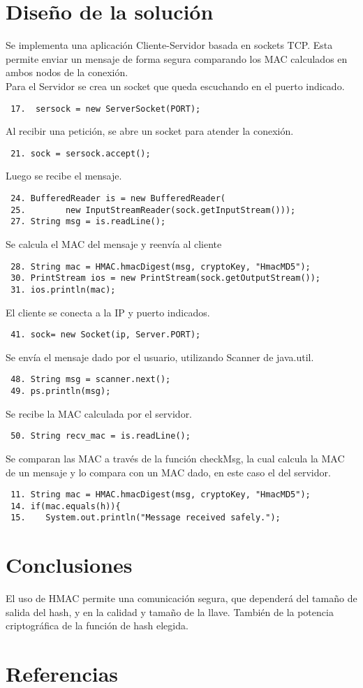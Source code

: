 \documentclass[letter, 10pt]{article}
\begin{document}
\section{Diseño de la solución}
Se implementa una aplicación Cliente-Servidor basada en sockets TCP. Esta permite enviar un mensaje de forma
segura comparando los MAC calculados en ambos nodos de la conexión.
\newline
\\
Para el Servidor se crea un socket que queda escuchando en el puerto indicado.
\begin{verbatim}
 17.  sersock = new ServerSocket(PORT);
\end{verbatim}
Al recibir una petición, se abre un socket para atender la conexión.  
\begin{verbatim}
 21. sock = sersock.accept();
\end{verbatim}
Luego se recibe el mensaje.
\begin{verbatim}
 24. BufferedReader is = new BufferedReader(
 25.        new InputStreamReader(sock.getInputStream()));
 27. String msg = is.readLine();
\end{verbatim}
Se calcula el MAC del mensaje y reenvía al cliente
\begin{verbatim}
 28. String mac = HMAC.hmacDigest(msg, cryptoKey, "HmacMD5"); 
 30. PrintStream ios = new PrintStream(sock.getOutputStream());
 31. ios.println(mac);
\end{verbatim}

El cliente se conecta a la IP y puerto indicados.
\begin{verbatim}
 41. sock= new Socket(ip, Server.PORT);
\end{verbatim}
Se envía el mensaje dado por el usuario, utilizando Scanner de java.util.
\begin{verbatim}
 48. String msg = scanner.next(); 
 49. ps.println(msg); 
\end{verbatim}
Se recibe la MAC calculada por el servidor.
\begin{verbatim}
 50. String recv_mac = is.readLine();  
\end{verbatim}
Se comparan las MAC a través de la función checkMsg, la cual calcula la MAC de un mensaje
y lo compara con un MAC dado, en este caso el del servidor.
\begin{verbatim}
 11. String mac = HMAC.hmacDigest(msg, cryptoKey, "HmacMD5");
 14. if(mac.equals(h)){                                 
 15.    System.out.println("Message received safely.");
\end{verbatim}

\newpage
\section{Conclusiones}
El uso de HMAC permite una comunicación segura, que dependerá del tamaño de salida del hash, y en la calidad
y tamaño de la llave. También de la potencia criptográfica de la función de hash elegida.


\section{Referencias}
\end{document}
